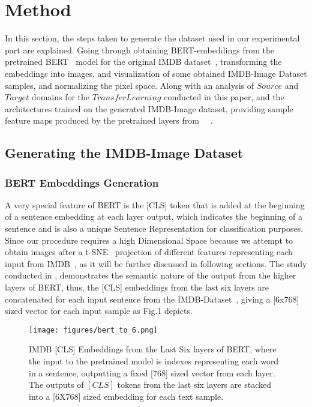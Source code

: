 \documentclass[conference]{IEEEtran}
\begin{document}
\section{Method}
In this section, the steps taken to generate the dataset used in our experimental part are explained. Going through obtaining BERT-embeddings from the pretrained BERT~\cite{Bert} model for the original IMDB dataset~\cite{imdb}, transforming the embeddings into images, and visualization of some obtained IMDB-Image Dataset samples, and normalizing the pixel space. Along with an analysis of $Source$ and $Target$ domains for the $Transfer Learning$ conducted in this paper, and the architectures trained on the generated IMDB-Image dataset, providing sample feature maps produced by the pretrained layers from \cite{resnet}~\cite{shufflenetv2}~\cite{vgg16}.

\subsection{Generating the IMDB-Image Dataset}

\subsubsection{BERT Embeddings Generation}
                A very special feature of BERT is the [CLS] token that is added at the 
				beginning of a sentence embedding at each layer output, which indicates 
				the beginning of a sentence and is also a unique Sentence Representation
				for classification purposes. Since our procedure requires a high Dimensional Space because we attempt to obtain images after a t-SNE~\cite{tsne} projection of different features representing each input from IMDB~\cite{imdb}, as it will be further discussed in following sections. The study conducted in \cite{bertvisual}, demonstrates the semantic nature of the output from the higher layers of BERT, thus, the [CLS] embeddings from the last six layers are concatenated for each input sentence from the IMDB-Dataset~\cite{imdb}, giving a [6x768] sized vector for each input sample as Fig.1 depicts.
				
				\begin{figure}[htpb]
                \centerline{\texttt{[image: figures/bert\_to\_6.png]}}
                \caption{IMDB [CLS] Embeddings from the Last Six layers of BERT, where the input to the pretrained model is indexes representing each word in a sentence, outputting a fixed [768] sized vector from each layer. The outputs of $[CLS]$ tokens from the last six layers are stacked into a [6X768] sized embedding for each text sample.}
                \label{figure-1}
                \end{figure}
                
\end{document}
